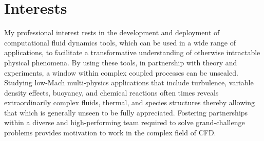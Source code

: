 \documentclass[letterpaper]{twentysecondcv_spd} %
\begin{document}






\makeprofile %


\section{Interests}

My professional interest rests in the development and deployment of computational fluid dynamics 
tools, which can be used in a wide range of applications, to facilitate a transformative understanding 
of otherwise intractable physical phenomena. By using these tools, in partnership with theory and
experiments, a window within complex coupled processes can be unsealed. Studying low-Mach multi-physics 
applications that include turbulence, variable density effects, buoyancy, and chemical reactions often times
reveals extraordinarily complex fluids, thermal, and species structures thereby allowing that which is
generally unseen to be fully appreciated. Fostering partnerships within a diverse and high-performing 
team required to solve grand-challenge problems provides motivation to work in the complex field of CFD.
\end{document}
